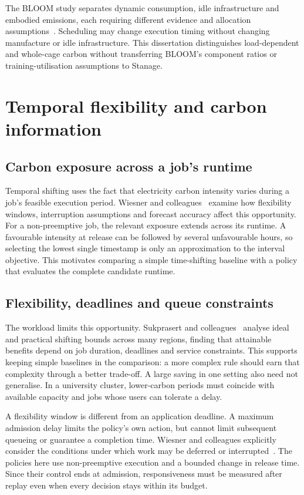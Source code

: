 The BLOOM study separates dynamic consumption, idle infrastructure and embodied emissions, each requiring different evidence and allocation assumptions~\citep{luccioni2023bloom}. Scheduling may change execution timing without changing manufacture or idle infrastructure. This dissertation distinguishes load-dependent and whole-cage carbon without transferring BLOOM's component ratios or training-utilisation assumptions to Stanage.

\section{Temporal flexibility and carbon information}

\subsection{Carbon exposure across a job's runtime}
Temporal shifting uses the fact that electricity carbon intensity varies during a job's feasible execution period. Wiesner and colleagues~\citep{wiesner2021wait} examine how flexibility windows, interruption assumptions and forecast accuracy affect this opportunity. For a non-preemptive job, the relevant exposure extends across its runtime. A favourable intensity at release can be followed by several unfavourable hours, so selecting the lowest single timestamp is only an approximation to the interval objective. This motivates comparing a simple time-shifting baseline with a policy that evaluates the complete candidate runtime.

\subsection{Flexibility, deadlines and queue constraints}
The workload limits this opportunity. Sukprasert and colleagues~\citep{sukprasert2024limitations} analyse ideal and practical shifting bounds across many regions, finding that attainable benefits depend on job duration, deadlines and service constraints. This supports keeping simple baselines in the comparison: a more complex rule should earn that complexity through a better trade-off. A large saving in one setting also need not generalise. In a university cluster, lower-carbon periods must coincide with available capacity and jobs whose users can tolerate a delay.

A flexibility window is different from an application deadline. A maximum admission delay limits the policy's own action, but cannot limit subsequent queueing or guarantee a completion time. Wiesner and colleagues explicitly consider the conditions under which work may be deferred or interrupted~\citep{wiesner2021wait}. The policies here use non-preemptive execution and a bounded change in release time. Since their control ends at admission, responsiveness must be measured after replay even when every decision stays within its budget.

